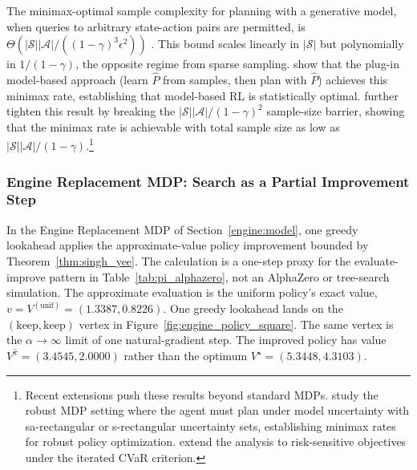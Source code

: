 The minimax-optimal sample complexity for planning with a generative model, when queries to arbitrary state-action pairs are permitted, is $\Theta(|\mathcal{S}||\mathcal{A}|/((1-\gamma)^3\epsilon^2))$ \citep{azar2013}. This bound scales linearly in $|\mathcal{S}|$ but polynomially in $1/(1-\gamma)$, the opposite regime from sparse sampling. \citet{agarwalKakadeYang2020} show that the plug-in model-based approach (learn $\hat{P}$ from samples, then plan with $\hat{P}$) achieves this minimax rate, establishing that model-based RL is statistically optimal. \citet{li2024breaking} further tighten this result by breaking the $|\mathcal{S}||\mathcal{A}|/(1-\gamma)^2$ sample-size barrier, showing that the minimax rate is achievable with total sample size as low as $|\mathcal{S}||\mathcal{A}|/(1-\gamma)$.\footnote{Recent extensions push these results beyond standard MDPs. \citet{clavier2024robust} study the robust MDP setting where the agent must plan under model uncertainty with sa-rectangular or s-rectangular uncertainty sets, establishing minimax rates for robust policy optimization. \citet{wang2025cvar} extend the analysis to risk-sensitive objectives under the iterated CVaR criterion.}



\FloatBarrier
\subsubsection{Engine Replacement MDP: Search as a Partial Improvement Step}
\label{engine:hybrid}

In the Engine Replacement MDP of Section~\ref{engine:model}, one greedy lookahead applies the approximate-value policy improvement bounded by Theorem~\ref{thm:singh_yee}. The calculation is a one-step proxy for the evaluate-improve pattern in Table~\ref{tab:pi_alphazero}, not an AlphaZero or tree-search simulation. The approximate evaluation is the uniform policy's exact value, $v=V^{(\mathrm{unif})}=(1.3387,0.8226)$. One greedy lookahead lands on the $(\text{keep},\text{keep})$ vertex in Figure~\ref{fig:engine_policy_square}. The same vertex is the $\alpha\to\infty$ limit of one natural-gradient step. The improved policy has value $V^{\hat\pi}=(3.4545,2.0000)$ rather than the optimum $V^\star=(5.3448,4.3103)$.



